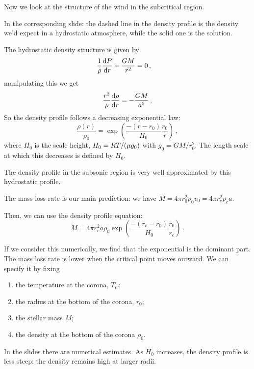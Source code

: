 \documentclass[main.tex]{subfiles}
\begin{document}
Now we look at the structure of the wind in the subcritical region.

In the corresponding slide: the dashed line in the density profile is the density we'd expect in a hydrostatic atmosphere, while the solid one is the solution.

The hydrostatic density structure is given by 
%
\begin{subequations}
\begin{align}
  \frac{1}{\rho } \dv{P}{r}  +\frac{GM }{r^2}  &= 0 
\,,
\end{align}
\end{subequations}
%
manipulating this we get 
%
\begin{equation}
  \frac{r^2}{\rho } \dv{\rho }{r} = - \frac{GM}{a^2}
\,,
\end{equation}
%
So the density profile follows a decreasing exponential law: 
%
\begin{equation}
  \frac{\rho (r)}{\rho_0 } = \exp(\frac{-(r-r_0 )}{H_0 } \frac{r_0}{r} ) 
\,,
\end{equation}
%
where \(H_0 \) is the scale height, \(H_0 = RT / \qty(\mu g_0 )\) with \(g_0 = GM / r_0^2\).
The length scale at which this decreases is defined by \(H_0 \). 

The density profile in the subsonic region is very well approximated by this hydrostatic profile.

The mass loss rate is our main prediction: we have \(\dot{M } = 4 \pi r^2_0 \rho_0 v_0 = 4 \pi r_c^2\rho_c a\).

Then, we can use the density profile equation: 
%
\begin{equation}
  \dot{M} = 4 \pi r_c^2 a \rho_0 \exp(\frac{-(r_c - r_0 )}{H_0 } \frac{r_0 }{r_c}) 
\,.
\end{equation}
%

If we consider this numerically, we find that the exponential is the dominant part.
The mass loss rate is lower when the critical point moves outward.
We can specify it by fixing 
%
\begin{enumerate}
    \item the temperature at the corona, \(T_C\);
    \item the radius at the bottom of the corona, \(r_0 \);
    \item the stellar mass \(M\);
    \item the density at the bottom of the corona \(\rho_0 \).
\end{enumerate}

In the slides there are numerical estimates. 
As \(H_0 \) increases, the density profile is less steep: the density remains high at larger radii.
\end{document}
